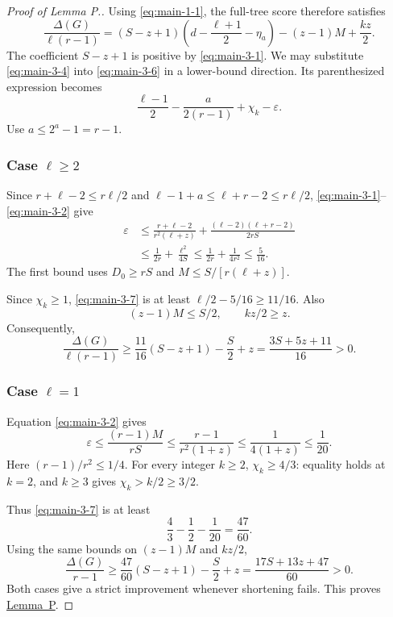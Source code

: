 \documentclass[11pt,reqno]{amsart}
\theoremstyle{plain}
\begin{document}
\begin{proof}[Proof of Lemma P.]
Using \eqref{eq:main-1-1}, the full-tree score therefore satisfies \[
\boxed{
\frac{\Delta(G)}{\ell(r-1)}
=(S-z+1)\left(d-\frac{\ell+1}{2}-\eta_a\right)
-(z-1)M+\frac{kz}{2}.
}
\tag{3.6}\label{eq:main-3-6}
\] The coefficient \(S-z+1\) is positive by \eqref{eq:main-3-1}. We may substitute \eqref{eq:main-3-4} into \eqref{eq:main-3-6} in a lower-bound direction. Its parenthesized expression becomes \[
\frac{\ell-1}{2}-\frac{a}{2(r-1)}+\chi_k-\varepsilon.
\tag{3.7}\label{eq:main-3-7}
\] Use \(a\le2^a-1=r-1\).

\subsubsection*{\texorpdfstring{Case \(\ell\ge2\)}{Case ell >= 2}}\label{case-ellge2}

Since \(r+\ell-2\le r\ell/2\) and \(\ell-1+a\le\ell+r-2\le r\ell/2\), \eqref{eq:main-3-1}--\eqref{eq:main-3-2} give \[
\begin{aligned}
\varepsilon
&\le\frac{r+\ell-2}{r^2(\ell+z)}
 +\frac{(\ell-2)(\ell+r-2)}{2rS}\\
&\le\frac1{2r}+\frac{\ell^2}{4S}
\le\frac1{2r}+\frac1{4r^2}
\le\frac5{16}.
\end{aligned}
\tag{3.8}\label{eq:main-3-8}
\] The first bound uses \(D_0\ge rS\) and \(M\le S/[r(\ell+z)]\).

Since \(\chi_k\ge1\), \eqref{eq:main-3-7} is at least \(\ell/2-5/16\ge11/16\). Also \[
(z-1)M\le S/2,\qquad kz/2\ge z.
\] Consequently, \[
\frac{\Delta(G)}{\ell(r-1)}
\ge\frac{11}{16}(S-z+1)-\frac S2+z
=\boxed{\frac{3S+5z+11}{16}>0}.
\tag{3.9}\label{eq:main-3-9}
\]

\subsubsection*{\texorpdfstring{Case \(\ell=1\)}{Case ell = 1}}\label{case-ell1}

Equation \eqref{eq:main-3-2} gives \[
\varepsilon
\le\frac{(r-1)M}{rS}
\le\frac{r-1}{r^2(1+z)}
\le\frac1{4(1+z)}\le\frac1{20}.
\tag{3.10}\label{eq:main-3-10}
\] Here \((r-1)/r^2\le1/4\). For every integer \(k\ge2\), \(\chi_k\ge4/3\): equality holds at \(k=2\), and \(k\ge3\) gives \(\chi_k>k/2\ge3/2\).

Thus \eqref{eq:main-3-7} is at least \[
\frac43-\frac12-\frac1{20}=\frac{47}{60}.
\] Using the same bounds on \((z-1)M\) and \(kz/2\), \[
\frac{\Delta(G)}{r-1}
\ge\frac{47}{60}(S-z+1)-\frac S2+z
=\boxed{\frac{17S+13z+47}{60}>0}.
\tag{3.11}\label{eq:main-3-11}
\] Both cases give a strict improvement whenever shortening fails. This proves \hyperref[lem:packet]{Lemma~P}. \end{proof}
\end{document}
